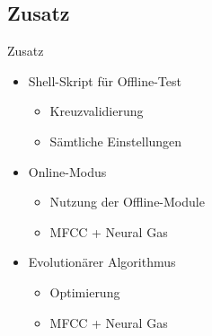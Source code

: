 \subsection{Zusatz}
\begin{frame}{Zusatz}
	\begin{itemize}[<+->]
		\item Shell-Skript für Offline-Test
		\begin{itemize}[<1->]
			\item Kreuzvalidierung
			\item Sämtliche Einstellungen
		\end{itemize}
		\item Online-Modus
		\begin{itemize}[<1->]
			\item Nutzung der Offline-Module
			\item MFCC + Neural Gas
		\end{itemize}
		\item Evolutionärer Algorithmus
		\begin{itemize}[<1->]
			\item Optimierung
			\item MFCC + Neural Gas
		\end{itemize}
	\end{itemize}
\end{frame}
